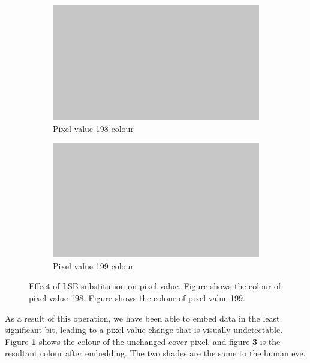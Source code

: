 \documentclass{l4proj}
\begin{document}
\begin{figure}[!h]
    \centering
    \begin{subfigure}[b]{0.45\textwidth}
        \includegraphics[width=\textwidth]{images/pixel_val_198.png}
        \caption{Pixel value 198 colour}
        \label{fig:pixel_value_198}
    \end{subfigure}
    \begin{subfigure}[b]{0.45\textwidth}
        \includegraphics[width=\textwidth]{images/pixel_val_199.png}
        \caption{Pixel value 199 colour}
        \label{fig:pixel_value_199}
    \end{subfigure}
    \caption{Effect of LSB substitution on pixel value. Figure  shows the colour of pixel value 198. Figure  shows the colour of pixel value 199.}
\end{figure}

As a result of this operation, we have been able to embed data in the least significant bit, leading to a pixel value change that is visually undetectable. Figure \textbf{\ref{fig:pixel_value_198}} shows the colour of the unchanged cover pixel, and figure \textbf{\ref{fig:pixel_value_199}} is the resultant colour after embedding. The two shades are the same to the human eye. 
\end{document}
